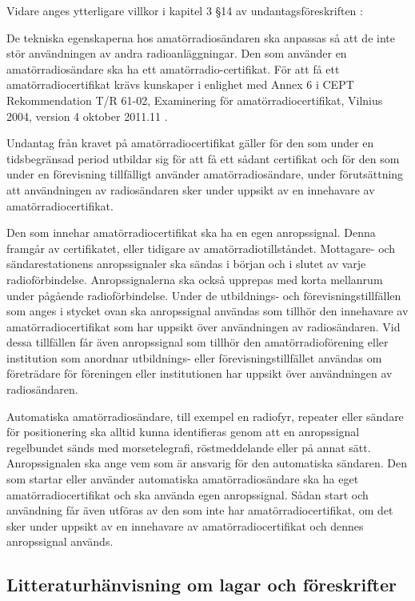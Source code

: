 Vidare anges ytterligare villkor i kapitel 3 \S 14 av undantagsföreskriften
\cite{PTSFS2015:4}:

De tekniska egenskaperna hos amatörradiosändaren ska anpassas så att de inte
stör användningen av andra radioanläggningar.
Den som använder en amatörradiosändare ska ha ett amatörradio-certifikat.
För att få ett amatörradiocertifikat krävs kunskaper i enlighet med Annex 6 i
CEPT Rekommendation T/R 61-02, Examinering för amatörradiocertifikat,
Vilnius 2004, version 4 oktober 2011.11 \cite{TR6102}.

Undantag från kravet på amatörradiocertifikat gäller för den som under en
tidsbegränsad period utbildar sig för att få ett sådant certifikat och för den
som under en förevisning tillfälligt använder amatörradiosändare, under
förutsättning att användningen av radiosändaren sker under uppsikt av en
innehavare av amatörradiocertifikat.

Den som innehar amatörradiocertifikat ska ha en egen anropssignal.
Denna framgår av certifikatet, eller tidigare av amatörradiotillståndet.
Mottagare- och sändarestationens anropssignaler ska sändas i början och i
slutet av varje radioförbindelse.
Anropssignalerna ska också upprepas med korta mellanrum under pågående
radioförbindelse. Under de utbildnings- och förevisningstillfällen som anges i
stycket ovan ska anropssignal användas som tillhör den innehavare av
amatörradiocertifikat som har uppsikt över användningen av radiosändaren.
Vid dessa tillfällen får även anropssignal som tillhör den amatörradioförening
eller institution som anordnar utbildnings- eller förevisningstillfället
användas om företrädare för föreningen eller institutionen har uppsikt över
användningen av radiosändaren.

Automatiska amatörradiosändare, till exempel en radiofyr, repeater eller
sändare för positionering ska alltid kunna identifieras genom att en
anropssignal regelbundet sänds med morsetelegrafi, röstmeddelande eller
på annat sätt.
Anropssignalen ska ange vem som är ansvarig för den automatiska sändaren.
Den som startar eller använder automatiska amatörradiosändare ska ha eget
amatörradiocertifikat och ska använda egen anropssignal.
Sådan start och användning får även utföras av den som inte har
amatörradiocertifikat, om det sker under uppsikt av en innehavare av
amatörradiocertifikat och dennes anropssignal används.

\subsection{Litteraturhänvisning om lagar och föreskrifter}

